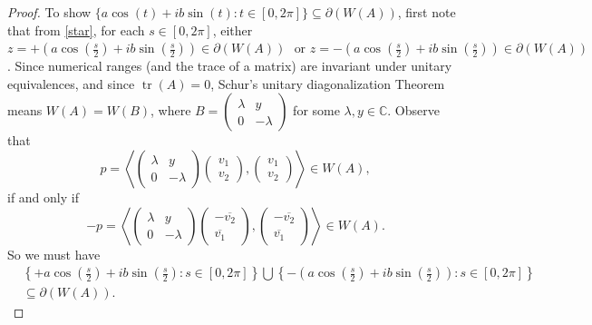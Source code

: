 \documentclass[12pt]{article}
\theoremstyle{plain}
\theoremstyle{definition}
\theoremstyle{remark}
\newcommand{\tr}{\operatorname{tr}}
\numberwithin{equation}{section}
\begin{document}
\begin{proof}
    To show $\{ a \cos(t) + ib \sin(t) :t \in [0,2\pi] \} \subseteq \partial(W(A))$, first note that from \eqref{star}, for each $s \in [0,2\pi]$, either $z = +(a \cos(\frac{s}{2}) + ib \sin(\frac{s}{2})) \in \partial (W(A)) \, \, \text{   or } z =  -(a \cos(\frac{s}{2}) + ib \sin(\frac{s}{2})) \in \partial (W(A))$. Since numerical ranges (and the trace of a matrix) are invariant under unitary equivalences, and since $\tr(A)=0$, Schur's unitary diagonalization Theorem \cite[Theorem 5.4.11]{watkins2004fundamentals} means $W(A) = W(B)$, where $B= \begin{pmatrix}
        \lambda & y \\
        0 & - \lambda
    \end{pmatrix}$
    for some $\lambda, y \in \mathbb{C}$. Observe that $$p = \left\langle \begin{pmatrix}
        \lambda & y \\
        0 & - \lambda
    \end{pmatrix}\begin{pmatrix}
        v_1 \\
        v_2
    \end{pmatrix}, \begin{pmatrix}
        v_1 \\
        v_2
    \end{pmatrix} \right\rangle \in W(A),$$ if and only if
    \begin{equation}\label{-invariant}
        -p = \left\langle\begin{pmatrix}
        \lambda & y \\
        0 & - \lambda
    \end{pmatrix}\begin{pmatrix}
        -\overline{v_2} \\
        \overline{v_1}
    \end{pmatrix}, \begin{pmatrix}
        -\overline{v_2} \\
        \overline{v_1}
    \end{pmatrix} \right\rangle \in W(A) .
    \end{equation}
    So we must have \begin{align}
    &\left\{ +a \cos(\frac{s}{2}) + ib \sin(\frac{s}{2}) : s \in [0,2\pi]\right\} \bigcup \left\{ -(a \cos(\frac{s}{2}) + ib \sin(\frac{s}{2})) :  s \in [0,2\pi] \right\} \\
    &\subseteq \partial(W(A)).\end{align}
\end{proof}
\end{document}
